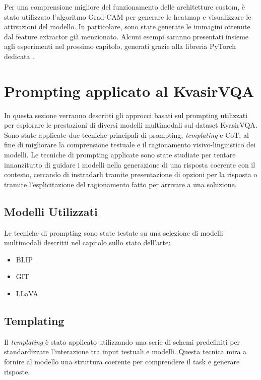 \documentclass[../main.tex]{subfiles}
\begin{document}
Per una comprensione migliore del funzionamento delle architetture custom, è stato utilizzato l'algoritmo Grad-CAM per generare le heatmap e visualizzare le attivazioni del modello. 
In particolare, sono state generate le immagini ottenute dal feature extractor già menzionato.
Alcuni esempi saranno presentati insieme agli esperimenti nel prossimo capitolo, generati grazie alla libreria PyTorch dedicata \cite{jacobgilpytorchcam}.

\section{Prompting applicato al KvasirVQA}

In questa sezione verranno descritti gli approcci basati sul prompting utilizzati per esplorare le prestazioni di diversi modelli multimodali sul dataset KvasirVQA. Sono state applicate due tecniche principali di prompting, \textit{templating} e CoT, al fine di migliorare la comprensione testuale e il ragionamento visivo-linguistico dei modelli. 
Le tecniche di prompting applicate sono state studiate per tentare innanzitutto di guidare i modelli nella generazione di una risposta coerente con il contesto, cercando di instradarli tramite presentazione di opzioni per la risposta o tramite l'esplicitazione del ragionamento fatto per arrivare a una soluzione.

\subsection{Modelli Utilizzati}

Le tecniche di prompting sono state testate su una selezione di modelli multimodali descritti nel capitolo sullo stato dell'arte:

\begin{itemize}
    \item BLIP
    \item GIT
    \item LLaVA
\end{itemize}

\subsection{Templating}

Il \textit{templating} è stato applicato utilizzando una serie di schemi predefiniti per standardizzare l’interazione tra input testuali e modelli. Questa tecnica mira a fornire al modello una struttura coerente per comprendere il task e generare risposte.
\end{document}
